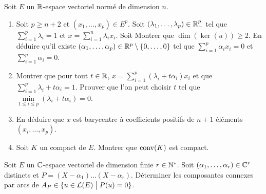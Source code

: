 \begin{exercise}
	Soit $E$ un $\mathbb{R}$-espace vectoriel normé de dimension $n$.
	\begin{enumerate}
		\item Soit $p\geqslant n+2$ et $(x_{1},\dots,x_{p})\in E^{p}$. Soit $(\lambda_{1},\dots,\lambda_{p})\in\mathbb{R}_{-}^{p}$ tel que $\sum_{i=1}^{p}\lambda_{i}=1$ et $x=\sum_{i=1}^{n}\lambda_{i}x_{i}$. Soit 
		Montrer que $\dim(\ker(u))\geqslant 2$. En déduire qu'il existe $(\alpha_{1},\dots,\alpha_{p})\in\mathbb{R}^{p}\setminus\{0,\dots,0\}$ tel que $\sum_{i=1}^{p}\alpha_{i}x_{i}=0$ et $\sum_{i=1}^{p}\alpha_{i}=0$.
		
		\item Montrer que pour tout $t\in\mathbb{R}$, $x=\sum_{i=1}^{p}(\lambda_{i}+t\alpha_{i})x_{i}$ et que $\sum_{i=1}^{p}\lambda_{i}+t\alpha_{i}=1$. Prouver que l'on peut choisir $t$ tel que $\min\limits_{1\leqslant i\leqslant p}(\lambda_{i}+t\alpha_{i})=0$.
		
		\item En déduire que $x$ est barycentre à coefficients positifs de $n+1$ éléments $(x_{i},\dots,x_{p})$.
		
		\item Soit $K$ un compact de $E$. Montrer que $\operatorname{conv}(K)$ est compact.
	\end{enumerate}
\end{exercise}

\begin{exercise}
	Soit $E$ un $\mathbb{C}$-espace vectoriel de dimension finie $r\in\mathbb{N}^{*}$. Soit $(\alpha_{1},\dots,\alpha_{r})\in\mathbb{C}^{r}$ distincts et $P=(X-\alpha_{1})\dots(X-\alpha_{r})$. Déterminer les composantes connexes par arcs de $A_{P}\in\{u\in\mathcal{L}(E)\bigm| P(u)=0\}$.
\end{exercise}

